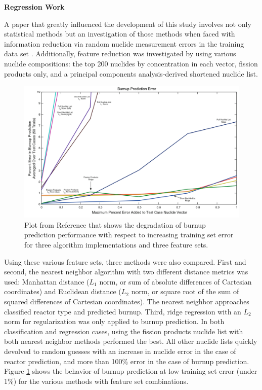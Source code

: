 \noindent \textbf{Regression Work}

A paper that greatly influenced the development of this study involves not only
statistical methods but an investigation of those methods when faced with
information reduction via random nuclide measurement errors in the training
data set \cite{dayman_feasibility_2013}.  Additionally, feature reduction was
investigated by using various nuclide compositions: the top 200 nuclides by
concentration in each vector, fission products only, and a principal components
analysis-derived shortened nuclide list.  

\begin{figure}[!htb]
  \centering
  \includegraphics[width=\linewidth]{./chapters/litrev/dayman.png}
  \caption{Plot from Reference \cite{dayman_feasibility_2013} that shows the 
           degradation of burnup prediction performance with respect to 
           increasing training set error for three algorithm implementations 
           and three feature sets.}
  \label{fig:dayman}
\end{figure}

Using these various feature sets, three methods were also compared. First and
second, the nearest neighbor algorithm with two different distance metrics was
used: Manhattan distance ($L_1$ norm, or sum of absolute differences of
Cartesian coordinates) and Euclidean distance ($L_2$ norm, or square root of
the sum of squared differences of Cartesian coordinates).  The nearest neighbor
approaches classified reactor type and predicted burnup.  Third, ridge
regression with an $L_2$ norm for regularization was only applied to burnup
prediction.  In both classification and regression cases, using the fission
products nuclide list with both nearest neighbor methods performed the best.
All other nuclide lists quickly devolved to random guesses with an increase in
nuclide error in the case of reactor prediction, and more than 100\% error in
the case of burnup prediction. Figure \ref{fig:dayman} shows the behavior of
burnup prediction at low training set error (under 1\%) for the various methods
with feature set combinations. 

